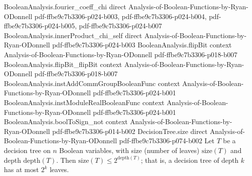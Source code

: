 \begin{lemma}
\proofstep
  {BooleanAnalysis.fourier_coeff_chi}
  {direct}
  {Analysis-of-Boolean-Functions-by-Ryan-ODonnell}
  {pdf-ffbe9c7b3306-p024-b003,
    pdf-ffbe9c7b3306-p024-b004,
    pdf-ffbe9c7b3306-p024-b005,
    pdf-ffbe9c7b3306-p024-b007}
\proofstep
  {BooleanAnalysis.innerProduct_chi_self}
  {direct}
  {Analysis-of-Boolean-Functions-by-Ryan-ODonnell}
  {pdf-ffbe9c7b3306-p024-b003}
\proofstep
  {BooleanAnalysis.flipBit}
  {context}
  {Analysis-of-Boolean-Functions-by-Ryan-ODonnell}
  {pdf-ffbe9c7b3306-p018-b007}
\proofstep
  {BooleanAnalysis.flipBit_flipBit}
  {context}
  {Analysis-of-Boolean-Functions-by-Ryan-ODonnell}
  {pdf-ffbe9c7b3306-p018-b007}
\proofstep
  {BooleanAnalysis.instAddCommGroupBooleanFunc}
  {context}
  {Analysis-of-Boolean-Functions-by-Ryan-ODonnell}
  {pdf-ffbe9c7b3306-p024-b001}
\proofstep
  {BooleanAnalysis.instModuleRealBooleanFunc}
  {context}
  {Analysis-of-Boolean-Functions-by-Ryan-ODonnell}
  {pdf-ffbe9c7b3306-p024-b001}
\proofstep
  {BooleanAnalysis.boolToSign_not}
  {context}
  {Analysis-of-Boolean-Functions-by-Ryan-ODonnell}
  {pdf-ffbe9c7b3306-p014-b002}
\proofstep
  {DecisionTree.size}
  {direct}
  {Analysis-of-Boolean-Functions-by-Ryan-ODonnell}
  {pdf-ffbe9c7b3306-p074-b002}
Let $T$ be a decision tree on $n$ Boolean variables, with size (number of leaves)
$\mathrm{size}(T)$ and depth $\mathrm{depth}(T)$. Then $\mathrm{size}(T) \le
2^{\mathrm{depth}(T)}$; that is, a decision tree of depth $k$ has at most $2^{k}$
leaves.
\end{lemma}

